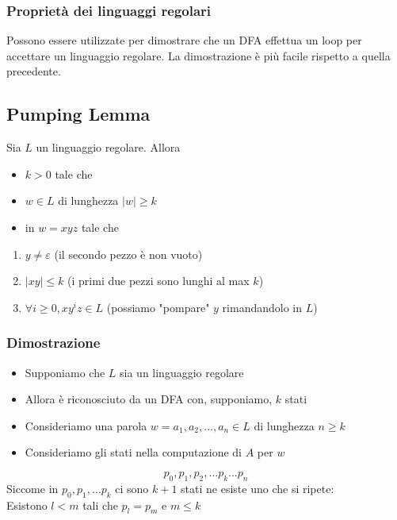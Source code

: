 \subsubsection{Proprietà dei linguaggi regolari}
Possono essere utilizzate per dimostrare che un DFA effettua un loop per accettare un linguaggio regolare.
La dimostrazione è più facile rispetto a quella precedente. 
\subsection{Pumping Lemma}
Sia $L$ un linguaggio regolare. Allora
\begin{itemize}
	\item  {} $k>0$ tale che 
	\item  {} $w\in L$ di lunghezza $|w|\geq k$ 
	\item  {} in $w =xyz$ tale che 
\end{itemize}
\begin{enumerate}
	\item $y\neq \varepsilon$ (il secondo pezzo è non vuoto)
	\item $|xy|\leq k$ (i primi due pezzi sono lunghi al max $k$)
	\item $\forall i \geq 0, xy^iz\in L$ (possiamo "pompare" $y$ rimandandolo in $L$)
\end{enumerate}
\subsubsection{Dimostrazione}
\begin{itemize}
	\item Supponiamo che $L$ sia un linguaggio regolare
	\item Allora è riconosciuto da un DFA con, supponiamo, $k$ stati
	\item Consideriamo una parola $w = a_1, a_2, \dots, a_n\in L$ di lunghezza $n\geq k$ 
	\item Consideriamo gli stati nella computazione di $A$ per $w$ 
\end{itemize}
$$p_0, p_1, p_2,\dots p_k\dots p_n$$
Siccome in $p_0, p_1,\dots p_k$ ci sono $k+1$ stati ne esiste uno che si ripete:\\
Esistono $l< m$ tali che $p_l=p_m$ e $m \leq k$ 

